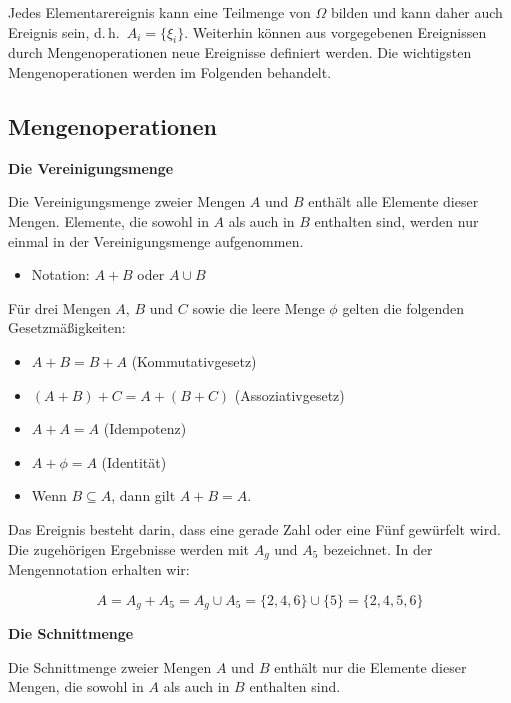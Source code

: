 Jedes Elementarereignis kann eine Teilmenge von $\Omega$ bilden und kann daher auch Ereignis sein, d.\,h.\ $A_i = \{\xi_i\}$. Weiterhin können aus vorgegebenen Ereignissen durch Mengenoperationen neue Ereignisse definiert werden. Die wichtigsten Mengenoperationen werden im Folgenden behandelt.

\subsection{Mengenoperationen}
\label{sec:mengenoperationen}

\textbf{Die Vereinigungsmenge}

Die Vereinigungsmenge zweier Mengen $A$ und $B$ enthält alle Elemente dieser Mengen. Elemente, die sowohl in $A$ als auch in $B$ enthalten sind, werden nur einmal in der Vereinigungsmenge aufgenommen.

\begin{itemize}
  \item Notation: $A + B$ oder $A \cup B$
\end{itemize}

Für drei Mengen $A$, $B$ und $C$ sowie die leere Menge $\phi$ gelten die folgenden Gesetzmäßigkeiten:

\begin{itemize}
  \item $A + B = B + A$ \hfill (Kommutativgesetz)
  \item $(A + B) + C = A + (B + C)$ \hfill (Assoziativgesetz)
  \item $A + A = A$ \hfill (Idempotenz)
  \item $A + \phi = A$ \hfill (Identität)
  \item Wenn $B \subseteq A$, dann gilt $A + B = A$.
\end{itemize}


\begin{beispiel}[Vereinigungsmenge]
Das Ereignis besteht darin, dass eine gerade Zahl oder eine Fünf gewürfelt wird. Die zugehörigen Ergebnisse werden mit $A_g$ und $A_5$ bezeichnet. In der Mengennotation erhalten wir:

$$
A = A_g + A_5 = A_g \cup A_5 = \{2,4,6\} \cup \{5\} = \{2,4,5,6\}
$$
\end{beispiel}

\textbf{Die Schnittmenge}

Die Schnittmenge zweier Mengen $A$ und $B$ enthält nur die Elemente dieser Mengen, die sowohl in $A$ als auch in $B$ enthalten sind.

